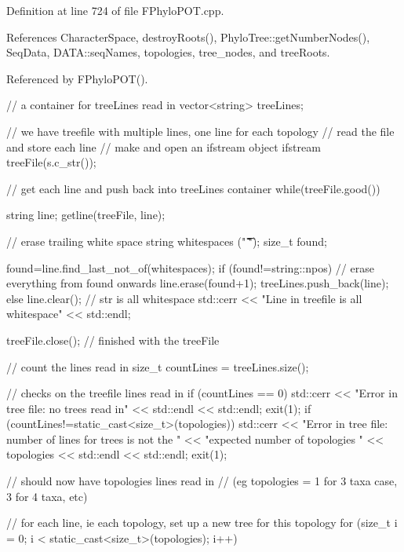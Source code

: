 \-Definition at line 724 of file \-F\-Phylo\-P\-O\-T.\-cpp.



\-References \-Character\-Space, destroy\-Roots(), \-Phylo\-Tree\-::get\-Number\-Nodes(), \-Seq\-Data, \-D\-A\-T\-A\-::seq\-Names, topologies, tree\-\_\-nodes, and tree\-Roots.



\-Referenced by \-F\-Phylo\-P\-O\-T().


\begin{DoxyCode}
{
                    // a container for treeLines read in
  vector<string> treeLines;

  // we have treefile with multiple lines, one line for each topology
  // read the file and store each line
                    // make and open an ifstream object
  ifstream treeFile(s.c_str());

  // get each line and push back into treeLines container
  while(treeFile.good())
  {
    string line;
    getline(treeFile, line);

    // erase trailing white space
    string whitespaces (" \t\f\v\n\r");
    size_t found;

    found=line.find_last_not_of(whitespaces);
    if (found!=string::npos)
    {
                    // erase everything from found onwards
      line.erase(found+1);
      treeLines.push_back(line);
    }
    else
    {
      line.clear(); // str is all whitespace
      std::cerr << "Line in treefile is all whitespace" << std::endl;
    }
  }

  treeFile.close(); // finished with the treeFile

                    // count the lines read in
  size_t countLines = treeLines.size();

  // checks on the treefile lines read in
  if (countLines == 0)
  {
    std::cerr << "Error in tree file: no trees read in" << std::endl << 
      std::endl;
    exit(1);
  }
  if (countLines!=static_cast<size_t>(topologies))
  {
    std::cerr << "Error in tree file: number of lines for trees is not the "
              << "expected number of topologies " << topologies 
              << std::endl << std::endl;
    exit(1);
  }

  // should now have topologies lines read in 
  // (eg topologies = 1 for 3 taxa case, 3 for 4 taxa, etc)

  // for each line, ie each topology, set up a new tree for this topology
  for (size_t i = 0; i < static_cast<size_t>(topologies); i++)
  {

}}
\end{DoxyCode}
